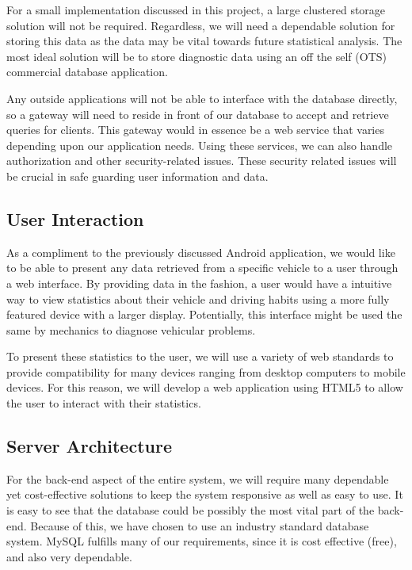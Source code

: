 \documentclass[12pt]{article}
\begin{document}
For a small implementation discussed in this project, a large clustered storage solution will not be required.  Regardless, we will need a dependable solution for storing this data as the data may be vital towards future statistical analysis.  The most ideal solution will be to store diagnostic data using an off the self (OTS) commercial database application.

Any outside applications will not be able to interface with the database directly, so a gateway will need to reside in front of our database to accept and retrieve queries for clients.  This gateway would in essence be a web service that varies depending upon our application needs.  Using these services, we can also handle authorization and other security-related issues.  These security related issues will be crucial in safe guarding user information and data.

\subsection{User Interaction}\label{subsec:UserInteraction}
As a compliment to the previously discussed Android application, we would like to be able to present any data retrieved from a specific vehicle to a user through a web interface.  By providing data in the fashion, a user would have a intuitive way to view statistics about their vehicle and driving habits using a more fully featured device with a larger display.  Potentially, this interface might be used the same by mechanics to diagnose vehicular problems. 	 

To present these statistics to the user, we will use a variety of web standards to provide compatibility for many devices ranging from desktop computers to mobile devices.  For this reason, we will develop a web application using HTML5 to allow the user to interact with their statistics.

\subsection{Server Architecture}\label{subsec:ServerArchitecture}

For the back-end aspect of the entire system, we will require many dependable yet cost-effective solutions to keep the system responsive as well as easy to use.  It is easy to see that the database could be possibly the most vital part of the back-end.  Because of this, we have chosen to use an industry standard database system.  MySQL fulfills many of our requirements, since it is cost effective (free), and also very dependable.
\end{document}

